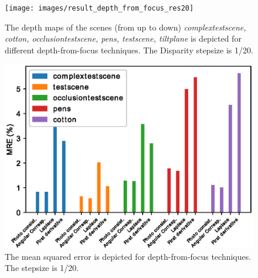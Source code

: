 \documentclass  [
  paper    = a4,
  BCOR     = 10mm,
  twoside,
  fontsize = 12pt,
  fleqn,
  toc      = bibnumbered,
  toc      = listofnumbered,
  numbers  = noendperiod,
  headings = normal,
  listof   = leveldown,
  version  = 3.03
]                                       {scrreprt}
\begin{document}
	\begin{figure}
		\centering
		\texttt{[image: images/result\_depth\_from\_focus\_res20]}
		\caption[Depth from focus: depthmaps]{The depth maps of the scenes (from up to down) \textit{complextestscene, cotton, occlusiontestscene, pens, testscene, tiltplane} is depicted for different depth-from-focus techniques. The Disparity stepsize is 1/20.}
		\label{fig:resultdepthfromfocus}
	\end{figure}

	\begin{figure}
		\centering
		\includegraphics[width=0.7\linewidth]{images/error_res20_all}
		\caption[Mean squared error for depth-from-focus techniques]{The mean squared error is depicted for depth-from-focus techniques. The stepsize is 1/20.}
		\label{fig:errorres20all}
	\end{figure}
	

	
	
	
	
	
	
\end{document}

